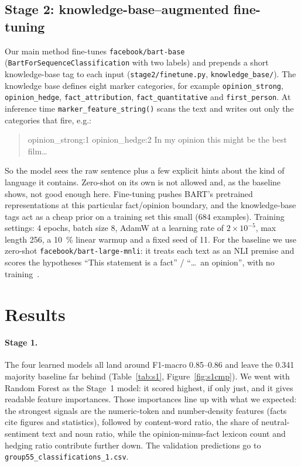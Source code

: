 \documentclass[12pt,a4paper,twocolumn]{article}
\begin{document}
\subsection{Stage 2: knowledge-base--augmented fine-tuning}
\label{sec:m-stage2}
Our main method fine-tunes \texttt{facebook/bart-base}
(\texttt{BartForSequenceClassification} with two labels) and prepends a short
knowledge-base tag to each input (\texttt{stage2/finetune.py},
\texttt{knowledge\_base/}). The knowledge base defines eight marker categories,
for example \texttt{opinion\_strong}, \texttt{opinion\_hedge},
\texttt{fact\_attribution}, \texttt{fact\_quantitative} and
\texttt{first\_person}. At inference time \texttt{marker\_feature\_string()}
scans the text and writes out only the categories that fire, e.g.:
\begin{quote}\small\ttfamily
[kb] opinion\_strong:1 opinion\_hedge:2 In my opinion this might be the best
film\dots
\end{quote}
So the model sees the raw sentence plus a few explicit hints about the kind of
language it contains. Zero-shot on its own is not allowed and, as the baseline
shows, not good enough here. Fine-tuning pushes BART's pretrained
representations at this particular fact/opinion boundary, and the knowledge-base
tags act as a cheap prior on a training set this small (684 examples). Training
settings: 4 epochs, batch size 8, AdamW at a learning rate of
$2\!\times\!10^{-5}$, max length 256, a \SI{10}{\percent} linear warmup and a
fixed seed of 11. For the baseline we use zero-shot
\texttt{facebook/bart-large-mnli}: it treats each text as an NLI premise and
scores the hypotheses ``This statement is a fact'' / ``\dots\ an opinion'', with
no training~\citep{williams2018mnli}.

\section{Results}
\label{sec:results}

\paragraph{Stage 1.}
The four learned models all land around F1-macro \numrange{0.85}{0.86} and leave
the \num{0.341} majority baseline far behind (Table~\ref{tab:s1},
Figure~\ref{fig:s1cmp}). We went with Random Forest as the Stage~1 model: it
scored highest, if only just, and it gives readable feature importances. Those
importances line up with what we expected: the strongest signals are the
numeric-token and number-density features (facts cite figures and statistics),
followed by content-word ratio, the share of neutral-sentiment text and noun
ratio, while the opinion-minus-fact lexicon count and hedging ratio contribute
further down. The validation predictions go to
\texttt{group55\_classifications\_1.csv}.
\end{document}
